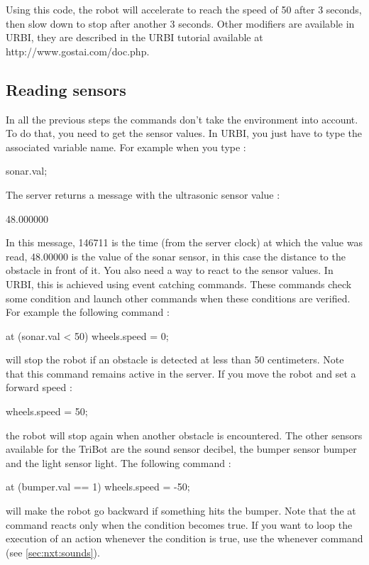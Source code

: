 Using this code, the robot will accelerate to reach the speed of 50 after 3
seconds, then slow down to stop after another 3 seconds.
Other modifiers are available in URBI, they are described in the URBI tutorial
available at http://www.gostai.com/doc.php.

\subsection{Reading sensors}
In all the previous steps the commands don't take the environment into account.
To do that, you need to get the sensor values. In URBI, you just have to type
the associated variable name. For example when you type :
\begin{urbiunchecked}
  sonar.val;
\end{urbiunchecked}

The server returns a message with the ultrasonic sensor value :
\begin{urbiunchecked}
  [146711] 48.000000
\end{urbiunchecked}

In this message, 146711 is the time (from the server clock) at which the value
was read, 48.00000 is the value of the sonar sensor, in this case the distance
to the obstacle in front of it.
You also need a way to react to the sensor values. In URBI, this is achieved
using event catching commands. These commands check some condition and launch
other commands when these conditions are verified. For example the following
command :
\begin{urbiunchecked}
  at (sonar.val < 50) wheels.speed = 0;
\end{urbiunchecked}

will stop the robot if an obstacle is detected at less than 50 centimeters.
Note that this command remains active in the server. If you move the robot and
set a forward speed :
\begin{urbiunchecked}
  wheels.speed = 50;
\end{urbiunchecked}

the robot will stop again when another obstacle is encountered.
The other sensors available for the TriBot are the sound sensor decibel, the
bumper sensor bumper and the light sensor light. The following command :
\begin{urbiunchecked}
  at (bumper.val == 1) wheels.speed = -50;
\end{urbiunchecked}

will make the robot go backward if something hits the bumper.
Note that the at command reacts only when the condition becomes true. If you
want to loop the execution of an action whenever the condition is true, use the
whenever command (see \autoref{sec:nxt:sounds}).


